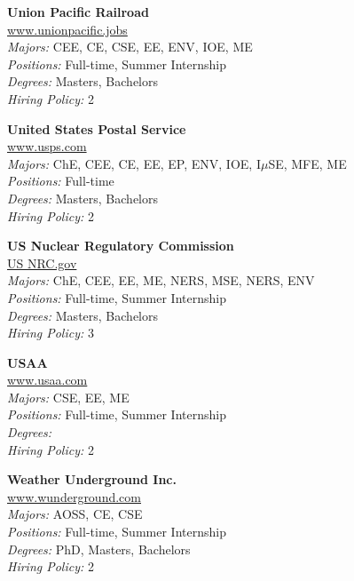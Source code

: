\documentclass{article}
\begin{document}
\begin{center}
\begin{multicols}{3}
\begin{minipage}{.9\columnwidth}{\Large\bf Union Pacific Railroad }\\
	\url{www.unionpacific.jobs}\\
	\emph{Majors:} CEE, CE, CSE, EE, ENV, IOE, ME\\
	\emph{Positions:} Full-time, Summer Internship\\
	\emph{Degrees:} Masters, Bachelors\\
	\emph{Hiring Policy:} 2\\
\end{minipage}
 
\begin{minipage}{.9\columnwidth}{\Large\bf United States Postal Service }\\
	\url{www.usps.com}\\
	\emph{Majors:} ChE, CEE, CE, EE, EP, ENV, IOE, I$\mu$SE, MFE, ME\\
	\emph{Positions:} Full-time\\
	\emph{Degrees:} Masters, Bachelors\\
	\emph{Hiring Policy:} 2\\
\end{minipage}
 
\begin{minipage}{.9\columnwidth}{\Large\bf US Nuclear Regulatory Commission }\\
	\url{US NRC.gov}\\
	\emph{Majors:} ChE, CEE, EE, ME, NERS, MSE, NERS, ENV\\
	\emph{Positions:} Full-time, Summer Internship\\
	\emph{Degrees:} Masters, Bachelors\\
	\emph{Hiring Policy:} 3\\
\end{minipage}
 
\begin{minipage}{.9\columnwidth}{\Large\bf USAA }\\
	\url{www.usaa.com}\\
	\emph{Majors:} CSE, EE, ME\\
	\emph{Positions:} Full-time, Summer Internship\\
	\emph{Degrees:} \\
	\emph{Hiring Policy:} 2\\
\end{minipage}
 
\begin{minipage}{.9\columnwidth}{\Large\bf Weather Underground Inc. }\\
	\url{www.wunderground.com}\\
	\emph{Majors:} AOSS, CE, CSE\\
	\emph{Positions:} Full-time, Summer Internship\\
	\emph{Degrees:} PhD, Masters, Bachelors\\
	\emph{Hiring Policy:} 2\\
\end{minipage}
 

\end{multicols}
\end{center}
\end{document}
